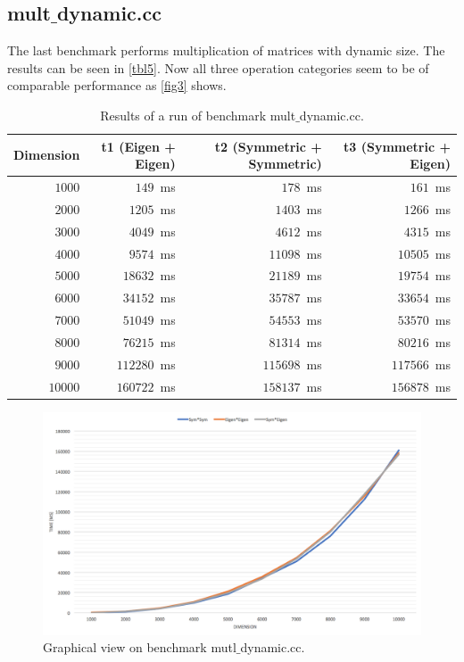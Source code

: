 \documentclass[a4wide]{scrartcl}
\begin{document}
\subsection{mult$\_$dynamic.cc}
The last benchmark performs multiplication of matrices with dynamic size. The results can be seen in \autoref{tbl5}. Now all three operation categories seem to be of comparable performance as \autoref{fig3} shows.
\begin{table}
    \centering
\begin{tabular}{r|r|r|r}
    Dimension & t1 (Eigen + Eigen)  & t2 (Symmetric + Symmetric) & t3 (Symmetric + Eigen)  \\ \hline \hline
    $1000$  & $149$~ms & $178$~ms & $161$~ms\\
    $2000$  & $1205$~ms & $1403$~ms & $1266$~ms\\
    $3000$  & $4049$~ms & $4612$~ms & $4315$~ms\\
    $4000$  & $9574$~ms & $11098$~ms & $10505$~ms\\
    $5000$  & $18632$~ms & $21189$~ms & $19754$~ms\\
    $6000$  & $34152$~ms & $35787$~ms & $33654$~ms\\
    $7000$  & $51049$~ms & $54553$~ms & $53570$~ms \\
    $8000$  & $76215$~ms & $81314$~ms & $80216$~ms \\
    $9000$  & $112280$~ms & $115698$~ms & $117566$~ms\\
    $10000$ & $160722$~ms & $158137$~ms & $156878$~ms
    \end{tabular}
    \caption{Results of a run of benchmark mult$\_$dynamic.cc.}
    \label{tbl5}
\end{table}
\begin{figure}
    \includegraphics[width=\textwidth]{img/mult_dynamic.png}
    \caption{Graphical view on benchmark mutl$\_$dynamic.cc.}
    \label{fig3}
\end{figure}
\end{document}
